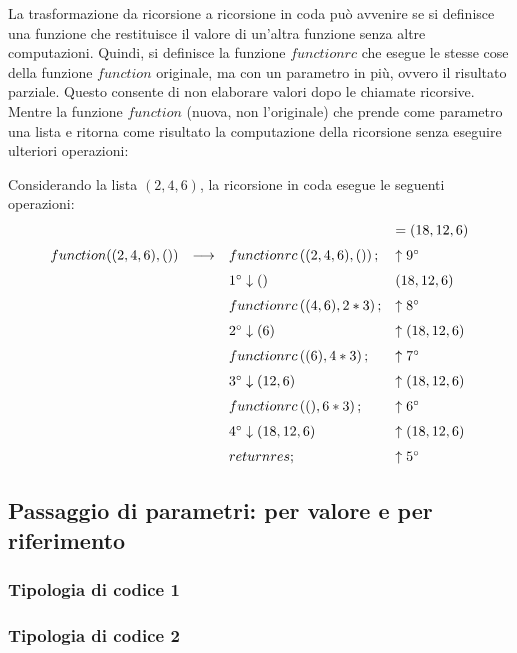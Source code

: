 \documentclass[a4paper]{article}
\begin{document}
	\noindent
	La trasformazione da ricorsione a ricorsione in coda può avvenire se si definisce una funzione che restituisce il valore di un'altra funzione senza altre computazioni. Quindi, si definisce la funzione $functionrc$ che esegue le stesse cose della funzione $function$ originale, ma con un parametro in più, ovvero il risultato parziale. Questo consente di non elaborare valori dopo le chiamate ricorsive. Mentre la funzione $function$ (nuova, non l'originale) che prende come parametro una lista e ritorna come risultato la computazione della ricorsione senza eseguire ulteriori operazioni:
	
	Considerando la lista $\left(2,4,6\right)$, la ricorsione in coda esegue le seguenti operazioni:
	\begin{equation*}
		\begin{array}{llll}
			&&& = (18,12,6)\\ [.6em]
			function((2,4,6), ()) &\longrightarrow& functionrc\left((2,4,6), ()\right);& \uparrow 9\degree\\ [.6em]
			&& 1\degree\downarrow () & (18, 12, 6) \\ [.6em]
			&& functionrc\left((4,6), 2*3\right);& \uparrow 8\degree \\ [.6em]
			&& 2\degree\downarrow (6)& \uparrow (18, 12, 6) \\ [.6em]
			&& functionrc\left((6), 4*3\right);& \uparrow 7\degree \\ [.6em]
			&& 3\degree\downarrow (12, 6)& \uparrow(18, 12, 6) \\ [.6em]
			&& functionrc\left((), 6*3\right);& \uparrow 6\degree \\ [.6em]
			&& 4\degree\downarrow (18, 12, 6)& \uparrow(18, 12, 6) \\ [.6em]
			&& return res;& \uparrow 5\degree
		\end{array}
	\end{equation*}
	
	\newpage
	\subsection{Passaggio di parametri: per valore e per riferimento}
	
	\subsubsection{Tipologia di codice 1}
	
	\subsubsection{Tipologia di codice 2}
	
\end{document}
